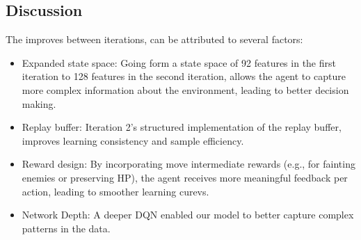 \subsection{Discussion}
The improves between iterations, can be attributed to several factors:
\begin{itemize}
    \item Expanded state space: Going form a state space of 92 features in the first iteration
    to 128 features in the second iteration, allows the agent to capture more complex information
    about the environment, leading to better decision making.
    \item Replay buffer: Iteration 2's structured implementation of the replay buffer, improves 
    learning consistency and sample efficiency.
    \item Reward design: By incorporating move intermediate rewards (e.g., for fainting enemies or preserving HP),
    the agent receives more meaningful feedback per action, leading to smoother learning curevs.
    \item Network Depth: A deeper DQN enabled our model to better capture complex patterns in the data.
\end{itemize}